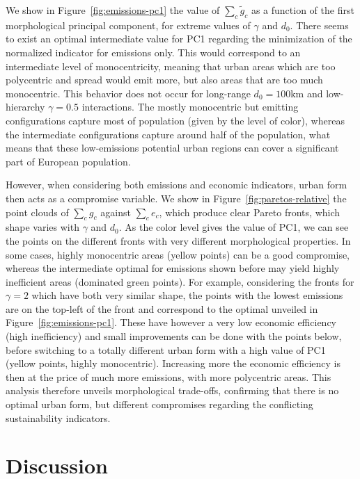 \documentclass{jimis-en}
\begin{document}
We show in Figure~\ref{fig:emissions-pc1} the value of $\sum_c \tilde{g}_c$ as a function of the first morphological principal component, for extreme values of $\gamma$ and $d_0$. There seems to exist an optimal intermediate value for PC1 regarding the minimization of the normalized indicator for emissions only. This would correspond to an intermediate level of monocentricity, meaning that urban areas which are too polycentric and spread would emit more, but also areas that are too much monocentric. This behavior does not occur for long-range $d_0 = 100$km and low-hierarchy $\gamma=0.5$ interactions. The mostly monocentric but emitting configurations capture most of population (given by the level of color), whereas the intermediate configurations capture around half of the population, what means that these low-emissions potential urban regions can cover a significant part of European population.


However, when considering both emissions and economic indicators, urban form then acts as a compromise variable. We show in Figure~\ref{fig:paretos-relative} the point clouds of $\sum_c g_c$ against $\sum_c e_c$, which produce clear Pareto fronts, which shape varies with $\gamma$ and $d_0$. As the color level gives the value of PC1, we can see the points on the different fronts with very different morphological properties. In some cases, highly monocentric areas (yellow points) can be a good compromise, whereas the intermediate optimal for emissions shown before may yield highly inefficient areas (dominated green points). For example, considering the fronts for $\gamma = 2$ which have both very similar shape, the points with the lowest emissions are on the top-left of the front and correspond to the optimal unveiled in Figure~\ref{fig:emissions-pc1}. These have however a very low economic efficiency (high inefficiency) and small improvements can be done with the points below, before switching to a totally different urban form with a high value of PC1 (yellow points, highly monocentric). Increasing more the economic efficiency is then at the price of much more emissions, with more polycentric areas. This analysis therefore unveils morphological trade-offs, confirming that there is no optimal urban form, but different compromises regarding the conflicting sustainability indicators.



\section{Discussion}
\end{document}
